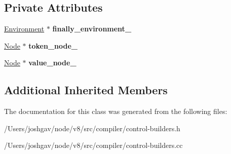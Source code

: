 \subsection*{Private Attributes}
\begin{DoxyCompactItemize}
\item 
\hyperlink{classv8_1_1internal_1_1compiler_1_1_ast_graph_builder_1_1_environment}{Environment} $\ast$ {\bfseries finally\+\_\+environment\+\_\+}\hypertarget{classv8_1_1internal_1_1compiler_1_1_try_finally_builder_a2aecae3e343e6ab9c2be76e564bdecf7}{}\label{classv8_1_1internal_1_1compiler_1_1_try_finally_builder_a2aecae3e343e6ab9c2be76e564bdecf7}

\item 
\hyperlink{classv8_1_1internal_1_1compiler_1_1_node}{Node} $\ast$ {\bfseries token\+\_\+node\+\_\+}\hypertarget{classv8_1_1internal_1_1compiler_1_1_try_finally_builder_a59634294a6fa6746027ca3126a3a3e77}{}\label{classv8_1_1internal_1_1compiler_1_1_try_finally_builder_a59634294a6fa6746027ca3126a3a3e77}

\item 
\hyperlink{classv8_1_1internal_1_1compiler_1_1_node}{Node} $\ast$ {\bfseries value\+\_\+node\+\_\+}\hypertarget{classv8_1_1internal_1_1compiler_1_1_try_finally_builder_adc27b6c4c1be07db15e939058f7fbd70}{}\label{classv8_1_1internal_1_1compiler_1_1_try_finally_builder_adc27b6c4c1be07db15e939058f7fbd70}

\end{DoxyCompactItemize}
\subsection*{Additional Inherited Members}


The documentation for this class was generated from the following files\+:\begin{DoxyCompactItemize}
\item 
/\+Users/joshgav/node/v8/src/compiler/control-\/builders.\+h\item 
/\+Users/joshgav/node/v8/src/compiler/control-\/builders.\+cc\end{DoxyCompactItemize}

